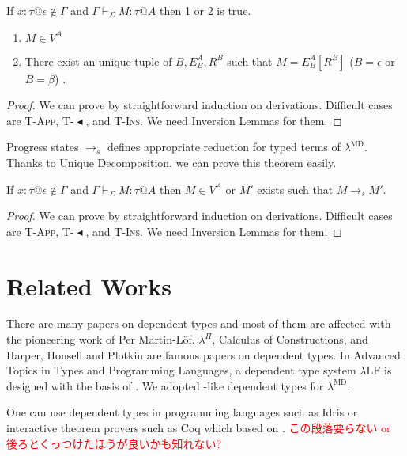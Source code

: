 \documentclass[runningheads]{llncs}
\newcommand{\red}[1]{\textcolor{red}{#1 }}
\newcommand{\LMD}{$\lambda^{\textrm{MD}}$\xspace}
\newcommand{\LLF}{$\lambda\textrm{LF}$\xspace}
\newcommand{\G}{\Gamma}
\newcommand{\V}{\vdash_\Sigma}
\newcommand{\TBL}{{\mathop{\blacktriangleleft}}}
\newcommand{\TApp}{\textsc{T-App}}
\newcommand{\TTBL}{\textsc{T-$\TBL$}}
\newcommand{\TIns}{\textsc{T-Ins}}
\begin{document}
  \begin{theorem}
      If $x:\tau @\epsilon \notin \G$ and $\G \V M : \tau @ A$ then 1 or 2 is true.
      \begin{enumerate}
          \item $ M \in V^A$
          \item There exist an unique tuple of $B, E^A_B, R^B$ such that $M = E^A_B[R^B]$ ($B = \epsilon$ or $B = \beta$) .
      \end{enumerate}
  \end{theorem}

  \begin{proof}
      We can prove by straightforward induction on derivations.
      Difficult cases are \TApp, \TTBL, and \TIns.
      We need Inversion Lemmas for them.
  \end{proof}

  Progress states $\longrightarrow_s$ defines appropriate reduction for typed terms of \LMD.
  Thanks to Unique Decomposition, we can prove this theorem easily.

  \begin{theorem}[Progress]
      If $x:\tau @\epsilon \notin \G$ and $\G \V M : \tau  @ A$ then
      $ M \in V^A $ or $M'$ exists such that $M \longrightarrow_s M'$.
  \end{theorem}

  \begin{proof}
      We can prove by straightforward induction on derivations.
      Difficult cases are \TApp, \TTBL, and \TIns.
      We need Inversion Lemmas for them.
  \end{proof}

  \section{Related Works}


  There are many papers on dependent types and most of them are affected with the pioneering work of Per Martin-L\"{o}f.
  $\lambda^\Pi$\cite{Meyer1986}, Calculus of Constructions\cite{coquand:inria-00076024}, 
  and Harper, Honsell and Plotkin\cite{harper1993framework} are famous papers on dependent types.
  In Advanced Topics in Types and Programming Languages\cite{attapl},
  a dependent type system \LLF is designed with the basis of \cite{harper1993framework}.
  We adopted \cite{attapl}-like dependent types for \LMD.

  One can use dependent types in programming languages such as Idris\cite{brady2013idris} or
  interactive theorem provers such as Coq\cite{09thecoq} which based on \cite{coquand:inria-00076024}.
  \red{この段落要らない or 後ろとくっつけたほうが良いかも知れない?}
\end{document}
